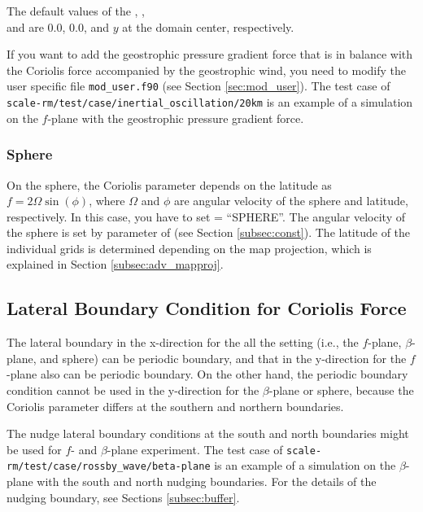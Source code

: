 The default values of the , , \\
and  are 0.0, 0.0, and $y$ at the domain center, respectively.

If you want to add the geostrophic pressure gradient force that is in balance with the Coriolis force accompanied by the geostrophic wind, you need to modify the user specific file \verb|mod_user.f90| (see Section \ref{sec:mod_user}).
The test case of \verb|scale-rm/test/case/inertial_oscillation/20km| is an example of a simulation on the $f$-plane with the geostrophic pressure gradient force.


\subsubsection{Sphere}
On the sphere, the Coriolis parameter depends on the latitude as $f = 2\Omega \sin(\phi)$, where $\Omega$ and $\phi$ are angular velocity of the sphere and latitude, respectively.
In this case, you have to set  = ``SPHERE''.
The angular velocity of the sphere is set by  parameter of  (see Section \ref{subsec:const}).
The latitude of the individual grids is determined depending on the map projection, which is explained in Section \ref{subsec:adv_mapproj}.



\subsection{Lateral Boundary Condition for Coriolis Force}

The lateral boundary in the x-direction for the all the setting (i.e., the $f$-plane, $\beta$-plane, and sphere) can be periodic boundary, and that in the y-direction for the $f$-plane also can be periodic boundary.
On the other hand, the periodic boundary condition cannot be used in the y-direction for the $\beta$-plane or sphere, because the Coriolis parameter differs at the southern and northern boundaries.


The nudge lateral boundary conditions at the south and north boundaries might be used for $f$- and $\beta$-plane experiment.
The test case of \verb|scale-rm/test/case/rossby_wave/beta-plane| is an example of a simulation on the $\beta$-plane with the south and north nudging boundaries.
For the details of the nudging boundary, see Sections \ref{subsec:buffer}.

